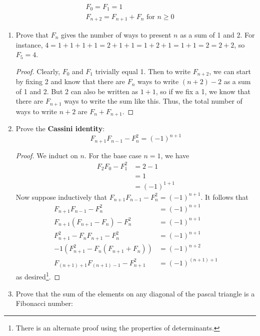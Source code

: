 \documentclass[../main.tex]{subfiles}
\begin{document}
\begin{enumerate}
    \begin{gather*}
        F_0 = F_1 = 1\\
        F_{n+2} = F_{n+1}+F_n\text{ for }n\geq 0
    \end{gather*}
    \begin{enumerate}
        \item Prove that $F_n$ gives the number of ways to present $n$ as a sum of 1 and 2. For instance, $4=1+1+1+1=2+1+1=1+2+1=1+1=2=2+2$, so $F_5=4$.
        \begin{proof}
            Clearly, $F_0$ and $F_1$ trivially equal 1. Then to write $F_{n+2}$, we can start by fixing 2 and know that there are $F_n$ ways to write $(n+2)-2$ as a sum of 1 and 2. But 2 can also be written as $1+1$, so if we fix a 1, we know that there are $F_{n+1}$ ways to write the sum like this. Thus, the total number of ways to write $n+2$ are $F_n+F_{n+1}$.
        \end{proof}
        \item Prove the \textbf{Cassini identity}:
        \begin{equation*}
            F_{n+1}F_{n-1}-F_n^2 = (-1)^{n+1}
        \end{equation*}
        \begin{proof}
            We induct on $n$. For the base case $n=1$, we have
            \begin{align*}
                F_2F_0-F_1^2 &= 2-1\\
                &= 1\\
                &= (-1)^{1+1}
            \end{align*}
            Now suppose inductively that $F_{n+1}F_{n-1}-F_n^2=(-1)^{n+1}$. It follows that
            \begin{align*}
                F_{n+1}F_{n-1}-F_n^2 &= (-1)^{n+1}\\
                F_{n+1}(F_{n+1}-F_n)-F_n^2 &= (-1)^{n+1}\\
                F_{n+1}^2-F_nF_{n+1}-F_n^2 &= (-1)^{n+1}\\
                -1(F_{n+1}^2-F_n(F_{n+1}+F_n)) &= (-1)^{n+2}\\
                F_{(n+1)+1}F_{(n+1)-1}-F_{n+1}^2 &= (-1)^{(n+1)+1}
            \end{align*}
            as desired\footnote{There is an alternate proof using the properties of determinants.}.
        \end{proof}
        \item Prove that the sum of the elements on any diagonal of the pascal triangle is a Fibonacci number:

\end{enumerate}
\end{enumerate}
\end{document}
